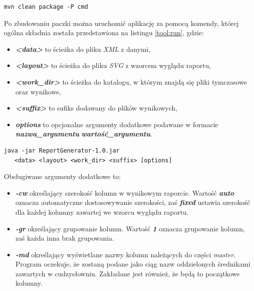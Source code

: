\documentclass[11pt,a4paper]{article}
\begin{document}
\lstset{language=sh}
\begin{lstlisting}[frame=single,caption=Komenda \emph{Mavena} budująca paczkę \emph{jar} z aplikacją,label=tool:build]
mvn clean package -P cmd
\end{lstlisting}

Po zbudowaniu paczki można uruchomić aplikację za pomocą komendy, której ogólna składnia została przedstawiona na listingu \ref{tool:run}, gdzie:
\begin{itemize}
	\item \emph{\textbf{\textless data\textgreater}} to ścieżka do pliku \emph{XML} z danymi,
	\item \emph{\textbf{\textless layout\textgreater}} to ścieżka do pliku \emph{SVG} z wzorcem wyglądu raportu,
	\item \emph{\textbf{\textless work\_dir\textgreater}} to ścieżka do katalogu, w którym znajdą się pliki tymczasowe oraz wynikowe,
	\item \emph{\textbf{\textless suffix\textgreater}} to sufiks dodawany do plików wynikowych,
	\item \emph{\textbf{options}} to opcjonalne argumenty dodatkowe podawane w formacie\\ \emph{\textbf{nazwa\_argumentu}} \emph{\textbf{wartość\_argumentu}}.
\end{itemize}
\lstset{language=sh}
\begin{lstlisting}[frame=single,caption=Komenda uruchamiająca aplikację,label=tool:run]
java -jar ReportGenerator-1.0.jar
   <data> <layout> <work_dir> <suffix> [options]
\end{lstlisting}


Obsługiwane argumenty dodatkowe to:
\begin{itemize}
	\item \emph{\textbf{-cw}} określający szerokość kolumn w wynikowym raporcie. Wartość \emph{\textbf{auto}} oznacza automatyczne dostosowywanie szerokości, zaś \emph{\textbf{fixed}} ustawia szerokość dla każdej kolumny zawartej we wzorcu wyglądu raportu.
	\item \emph{\textbf{-gr}} określający grupowanie kolumn. Wartość \emph{\textbf{1}} oznacza grupowanie kolumn, zaś każda inna brak grupowania.
	\item \emph{\textbf{-md}} określający wyświetlane nazwy kolumn należących do części \emph{master}. Program oczekuje, że zostaną podane jako ciąg nazw oddzielonych średnikami zawartych w cudzysłowniu. Zakładane jest również, że będą to początkowe kolumny.
\end{itemize}
\end{document}
